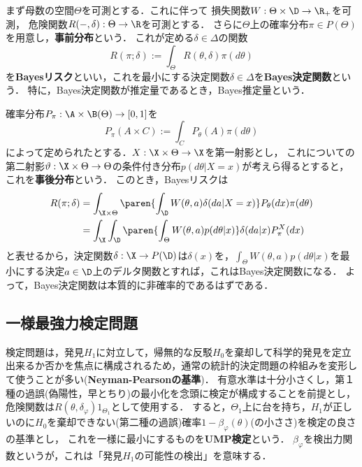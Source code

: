 \documentclass[uplatex,dvipdfmx]{jsreport}
\begin{document}
\begin{model}\label{model-Bayes-decision-function}
    まず母数の空間$\Theta$を可測とする．これに伴って
    損失関数$W:\Theta\times\D\to\R_+$を可測，
    危険関数$R(-,\delta):\Theta\to\R$を可測とする．
    さらに$\Theta$上の確率分布$\pi\in P(\Theta)$を用意し，\textbf{事前分布}という．
    これが定める$\delta\in\Delta$の関数
    \[R(\pi;\delta):=\int_\Theta R(\theta,\delta)\pi(d\theta)\]
    を\textbf{Bayesリスク}といい，これを最小にする決定関数$\delta\in\Delta$を\textbf{Bayes決定関数}という．
    特に，Bayes決定関数が推定量であるとき，Bayes推定量という．
\end{model}

\begin{observation}
    確率分布$P_\pi:\A\times\B(\Theta)\to[0,1]$を
    \[P_\pi(A\times C):=\int_CP_\theta(A)\pi(d\theta)\]
    によって定められたとする．$X:\X\times\Theta\to\X$を第一射影とし，
    これについての第二射影$\vartheta:\X\times\Theta\to\Theta$の条件付き分布$p(d\theta|X=x)$が考えら得るとすると，これを\textbf{事後分布}という．
    このとき，Bayesリスクは
    \begin{align*}
        R(\pi;\delta)&=\int_{\X\times\Theta}\paren{\int_\D W(\theta,a)\delta(da|X=x)}P_\theta(dx)\pi(d\theta)\\
        &=\int_\X\int_\D\paren{\int_\Theta W(\theta,a)p(d\theta|x)}\delta(da|x)P^X_\pi(dx)
    \end{align*}
    と表せるから，決定関数$\delta:\X\to P(\D)$は$\delta(x)$を，$\int_\Theta W(\theta,a)p(d\theta|x)$を最小にする決定$a\in\D$上のデルタ関数とすれば，これはBayes決定関数になる．
    よって，Bayes決定関数は本質的に非確率的であるはずである．
\end{observation}

\subsection{一様最強力検定問題}

\begin{tcolorbox}[colframe=ForestGreen, colback=ForestGreen!10!white,breakable,colbacktitle=ForestGreen!40!white,coltitle=black,fonttitle=\bfseries\sffamily,
title=検定とは，態度がそもそも非常に科学的な存在である．]
    検定問題は，発見$H_1$に対立して，帰無的な反駁$H_0$を棄却して科学的発見を定立出来るか否かを焦点に構成されるため，通常の統計的決定問題の枠組みを変形して使うことが多い(\textbf{Neyman-Pearsonの基準})．
    有意水準は十分小さくし，第１種の過誤(偽陽性，早とちり)の最小化を念頭に検定が構成することを前提とし，
    危険関数は$R(\theta,\delta_\varphi)1_{\Theta_1}$として使用する．
    すると，$\Theta_1$上に台を持ち，$H_1$が正しいのに$H_0$を棄却できない(第二種の過誤)確率$1-\beta_\varphi(\theta)$(の小ささ)を検定の良さの基準とし，
    これを一様に最小にするものを\textbf{UMP検定}という．
    $\beta_\varphi$を検出力関数というが，これは「発見$H_1$の可能性の検出」を意味する．
\end{tcolorbox}
\end{document}
